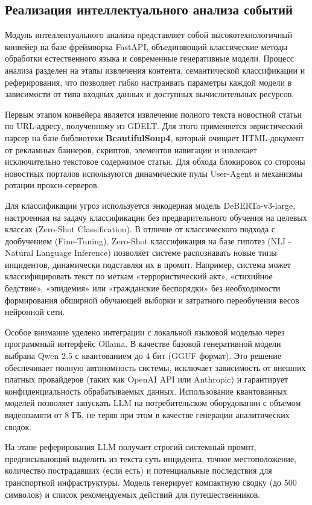 \subsection{Реализация интеллектуального анализа событий}

Модуль интеллектуального анализа представляет собой высокотехнологичный конвейер на базе фреймворка FastAPI, объединяющий классические методы обработки естественного языка и современные генеративные модели. Процесс анализа разделен на этапы извлечения контента, семантической классификации и реферирования, что позволяет гибко настраивать параметры каждой модели в зависимости от типа входных данных и доступных вычислительных ресурсов.

Первым этапом конвейера является извлечение полного текста новостной статьи по URL-адресу, полученному из GDELT. Для этого применяется эвристический парсер на базе библиотеки \textbf{BeautifulSoup4}, который очищает HTML-документ от рекламных баннеров, скриптов, элементов навигации и извлекает исключительно текстовое содержимое статьи. Для обхода блокировок со стороны новостных порталов используются динамические пулы User-Agent и механизмы ротации прокси-серверов.

Для классификации угроз используется энкодерная модель DeBERTa-v3-large, настроенная на задачу классификации без предварительного обучения на целевых классах (Zero-Shot Classification). В отличие от классического подхода с дообучением (Fine-Tuning), Zero-Shot классификация на базе гипотез (NLI - Natural Language Inference) позволяет системе распознавать новые типы инцидентов, динамически подставляя их в промпт. Например, система может классифицировать текст по меткам «террористический акт», «стихийное бедствие», «эпидемия» или «гражданские беспорядки» без необходимости формирования обширной обучающей выборки и затратного переобучения весов нейронной сети.

Особое внимание уделено интеграции с локальной языковой моделью через программный интерфейс Ollama. В качестве базовой генеративной модели выбрана Qwen 2.5 с квантованием до 4 бит (GGUF формат). Это решение обеспечивает полную автономность системы, исключает зависимость от внешних платных провайдеров (таких как OpenAI API или Anthropic) и гарантирует конфиденциальность обрабатываемых данных. Использование квантованных моделей позволяет запускать LLM на потребительском оборудовании с объемом видеопамяти от 8 ГБ, не теряя при этом в качестве генерации аналитических сводок.

На этапе реферирования LLM получает строгий системный промпт, предписывающий выделить из текста суть инцидента, точное местоположение, количество пострадавших (если есть) и потенциальные последствия для транспортной инфраструктуры. Модель генерирует компактную сводку (до 500 символов) и список рекомендуемых действий для путешественников.


